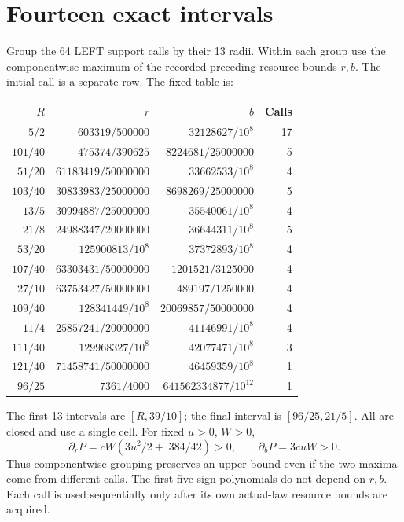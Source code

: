 \documentclass[11pt]{article}
\begin{document}
\section{Fourteen exact intervals}
Group the 64 LEFT support calls by their 13 radii. Within each group use the
componentwise maximum of the recorded preceding-resource bounds $r,b$.
The initial call is a separate row. The fixed table is:
\begin{center}\small
\begin{tabular}{rrrr}
\toprule $R$&$r$&$b$&Calls\\ \midrule
$5/2$&$603319/500000$&$32128627/10^8$&17\\
$101/40$&$475374/390625$&$8224681/25000000$&5\\
$51/20$&$61183419/50000000$&$33662533/10^8$&4\\
$103/40$&$30833983/25000000$&$8698269/25000000$&5\\
$13/5$&$30994887/25000000$&$35540061/10^8$&4\\
$21/8$&$24988347/20000000$&$36644311/10^8$&5\\
$53/20$&$125900813/10^8$&$37372893/10^8$&4\\
$107/40$&$63303431/50000000$&$1201521/3125000$&4\\
$27/10$&$63753427/50000000$&$489197/1250000$&4\\
$109/40$&$128341449/10^8$&$20069857/50000000$&4\\
$11/4$&$25857241/20000000$&$41146991/10^8$&4\\
$111/40$&$129968327/10^8$&$42077471/10^8$&3\\
$121/40$&$71458741/50000000$&$46459359/10^8$&1\\
$96/25$&$7361/4000$&$641562334877/10^{12}$&1\\
\bottomrule
\end{tabular}
\end{center}
The first 13 intervals are $[R,39/10]$; the final interval is $[96/25,21/5]$.
All are closed and use a single cell. For fixed $u>0$, $W>0$,
\[
 \partial_rP=cW(3u^2/2+.384/42)>0,\qquad
 \partial_bP=3cuW>0.
\]
Thus componentwise grouping preserves an upper bound even if the two maxima
come from different calls. The first five sign polynomials do not depend on
$r,b$. Each call is used sequentially only after its own actual-law resource
bounds are acquired.
\end{document}
